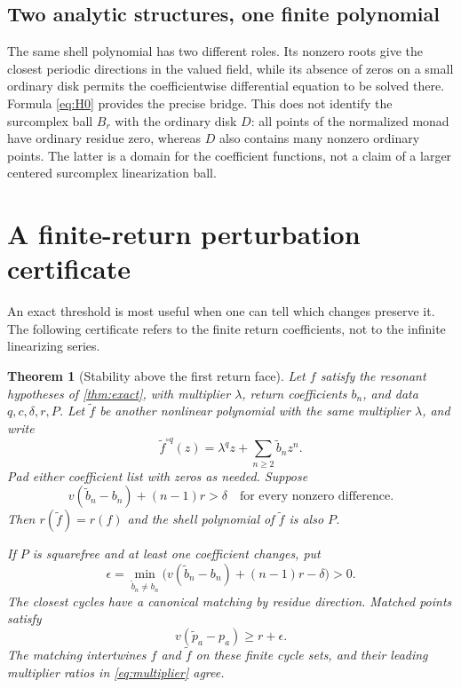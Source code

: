 \documentclass[11pt,letterpaper]{article}
\numberwithin{equation}{section}
\theoremstyle{plain}
\newtheorem{theorem}{Theorem}[section]
\theoremstyle{definition}
\theoremstyle{remark}
\begin{document}
\subsection{Two analytic structures, one finite polynomial}

The same shell polynomial has two different roles. Its nonzero roots give the
closest periodic directions in the valued field, while its absence of zeros
on a small ordinary disk permits the coefficientwise differential equation
to be solved there. Formula \eqref{eq:H0} provides the precise bridge.
This does not identify the surcomplex ball $B_r$ with the ordinary disk $D$:
all points of the normalized monad have ordinary residue zero, whereas $D$
also contains many nonzero ordinary points. The latter is a domain for the
coefficient functions, not a claim of a larger centered surcomplex
linearization ball.

\section{A finite-return perturbation certificate}\label{sec:stability}

An exact threshold is most useful when one can tell which changes preserve
it. The following certificate refers to the finite return coefficients, not
to the infinite linearizing series.

\begin{theorem}[Stability above the first return face]\label{thm:stability}
Let $f$ satisfy the resonant hypotheses of \cref{thm:exact}, with multiplier
$\lambda$, return coefficients $b_n$, and data $q,c,\delta,r,P$.
Let $\widetilde f$ be another nonlinear polynomial with the same multiplier
$\lambda$, and write
\[
 \widetilde f^{\circ q}(z)=\lambda^qz+\sum_{n\ge2}\widetilde b_nz^n.
\]
Pad either coefficient list with zeros as needed. Suppose
\begin{equation}\label{eq:stable-assumption}
 v(\widetilde b_n-b_n)+(n-1)r>\delta
 \quad\text{for every nonzero difference.}
\end{equation}
Then $r(\widetilde f)=r(f)$ and the shell polynomial of $\widetilde f$
is also $P$.

If $P$ is squarefree and at least one coefficient changes, put
\begin{equation}\label{eq:epsilon}
 \epsilon=\min_{\widetilde b_n\ne b_n}
     \bigl(v(\widetilde b_n-b_n)+(n-1)r-\delta\bigr)>0.
\end{equation}
The closest cycles have a canonical matching by residue direction. Matched
points satisfy
\begin{equation}\label{eq:stable-distance}
 v(\widetilde p_a-p_a)\ge r+\epsilon.
\end{equation}
The matching intertwines $f$ and $\widetilde f$ on these finite cycle sets,
and their leading multiplier ratios in \eqref{eq:multiplier} agree.
\end{theorem}
\end{document}
